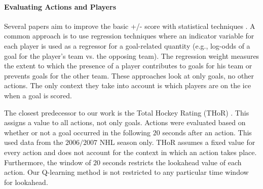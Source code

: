 \documentclass[]{article}
\begin{document}
\paragraph{Evaluating Actions and Players} Several papers aim to improve the basic +/- score with statistical techniques \citep{Macdonald2011a,Gramacy2013,Spagnola2013}. A common approach is to use regression techniques where an indicator variable for each player is used as a regressor for a goal-related quantity (e.g., log-odds of a goal for the player's team vs. the opposing team). The regression weight measures the extent to which the presence of a player contributes to goals for his team or prevents goals for the other team. These approaches look at only goals, no other actions. The only context they take into account is which players are on the ice when a goal is scored.

The closest predecessor to our work is the Total Hockey Rating (THoR) \citep{Schuckers2013}. This assigns a value to all actions, not only goals. Actions were evaluated based on whether or not a goal occurred in the following $20$ seconds after an action. %
This used data from the $2006/2007$ NHL season only. THoR assumes a fixed value for every action and does not account for the context in which an action takes place. Furthermore, the window of $20$ seconds restricts the lookahead value of each action. Our Q-learning method is not restricted to any particular time window for lookahead.




%
%
\end{document}

